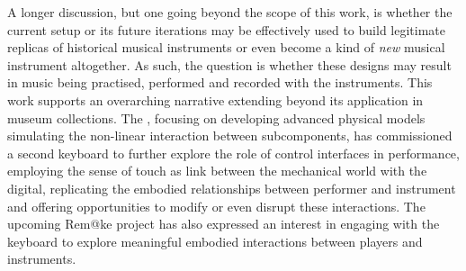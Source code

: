 A longer discussion, but one going beyond the scope of this work, is whether the current setup or its future iterations may be effectively used to build legitimate replicas of historical musical instruments or even become a kind of \emph{new} musical instrument altogether. As such, the question is whether these designs may result in music being practised, performed and recorded with the instruments. This work supports an overarching narrative extending beyond its application in museum collections. The , focusing on developing advanced physical models simulating the non-linear interaction between subcomponents, has commissioned a second keyboard to further explore the role of control interfaces in performance, employing the sense of touch as link between the mechanical world with the digital, replicating the embodied relationships between performer and instrument and offering opportunities to modify or even disrupt these interactions. The upcoming Rem@ke project \cite{remake1} has also expressed an interest in engaging with the keyboard to explore meaningful embodied interactions between players and instruments. 



